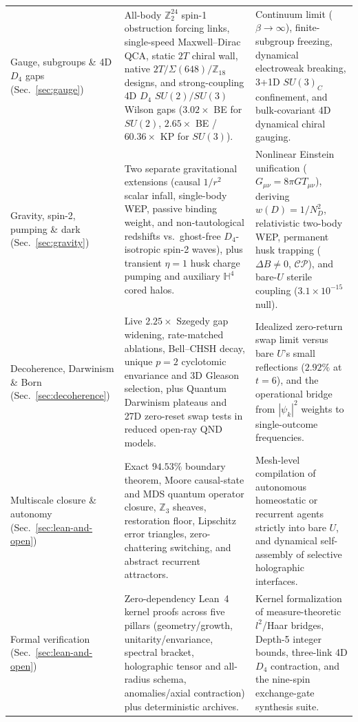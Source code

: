 \begin{table}[tb]
\begin{tabularx}{\textwidth}{@{}>{\raggedright\arraybackslash}p{2.95cm}>{\raggedright\arraybackslash}X>{\raggedright\arraybackslash}p{5.85cm}@{}}
\addlinespace[2pt]
Gauge, subgroups \& 4D $D_4$ gaps (Sec.~\ref{sec:gauge}) & All-body $\mathbb{Z}_2^{24}$ spin-1 obstruction forcing links, single-speed Maxwell--Dirac QCA, static $2T$ chiral wall, native $2T/\Sigma(648)/\mathbb{Z}_{18}$ designs, and strong-coupling 4D $D_4$ $SU(2)/SU(3)$ Wilson gaps ($3.02\times$ BE for $SU(2)$, $2.65\times$ BE / $60.36\times$ KP for $SU(3)$). & Continuum limit ($\beta \to \infty$), finite-subgroup freezing, dynamical electroweak breaking, 3+1D $SU(3)_C$ confinement, and bulk-covariant 4D dynamical chiral gauging. \\
\addlinespace[2pt]
Gravity, spin-2, pumping \& dark (Sec.~\ref{sec:gravity}) & Two separate gravitational extensions (causal $1/r^2$ scalar infall, single-body WEP, passive binding weight, and non-tautological redshifts vs.\ ghost-free $D_4$-isotropic spin-2 waves), plus transient $\eta = 1$ husk charge pumping and auxiliary $\mathbb{H}^4$ cored halos. & Nonlinear Einstein unification ($G_{\mu\nu} = 8\pi G T_{\mu\nu}$), deriving $w(D) = 1/N_D^2$, relativistic two-body WEP, permanent husk trapping ($\Delta B \neq 0$, $\mathcal{CP}$), and bare-$U$ sterile coupling ($3.1 \times 10^{-15}$ null). \\
\addlinespace[2pt]
Decoherence, Darwinism \& Born (Sec.~\ref{sec:decoherence}) & Live $2.25\times$ Szegedy gap widening, rate-matched ablations, Bell--CHSH decay, unique $p = 2$ cyclotomic envariance and 3D Gleason selection, plus Quantum Darwinism plateaus and 27D zero-reset swap tests in reduced open-ray QND models. & Idealized zero-return swap limit versus bare $U$'s small reflections ($2.92\%$ at $t = 6$), and the operational bridge from $|\psi_k|^2$ weights to single-outcome frequencies. \\
\addlinespace[2pt]
Multiscale closure \& autonomy (Sec.~\ref{sec:lean-and-open}) & Exact $94.53\%$ boundary theorem, Moore causal-state and MDS quantum operator closure, $\mathbb{Z}_3$ sheaves, restoration floor, Lipschitz error triangles, zero-chattering switching, and abstract recurrent attractors. & Mesh-level compilation of autonomous homeostatic or recurrent agents strictly into bare $U$, and dynamical self-assembly of selective holographic interfaces. \\
\addlinespace[2pt]
Formal verification (Sec.~\ref{sec:lean-and-open}) & Zero-dependency Lean~4 kernel proofs across five pillars (geometry/growth, unitarity/envariance, spectral bracket, holographic tensor and all-radius schema, anomalies/axial contraction) plus deterministic archives. & Kernel formalization of measure-theoretic $l^2$/Haar bridges, Depth-5 integer bounds, three-link 4D $D_4$ contraction, and the nine-spin exchange-gate synthesis suite. \\
\bottomrule
\end{tabularx}
\end{table}

